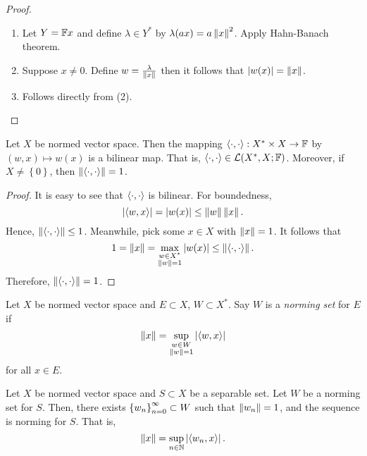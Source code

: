 \documentclass[a4paper]{article}
\begin{document}
\begin{proof}

\begin{enumerate}
\item Let $Y = \mathbb{F} x$ and define $\lambda \in Y^*$ by 
$\lambda(a x) = a \left\lVert x\right\rVert^2$. Apply Hahn-Banach theorem.

\item Suppose $x \neq 0$. Define $w = \frac{\lambda}{\left\lVert x\right\rVert}$
then it follows that $\left\lvert w(x)\right\rvert = \left\lVert x\right\rVert$.

\item Follows directly from (2).
\end{enumerate}

\end{proof}

\begin{prop}
Let $X$ be normed vector space. Then the mapping 
$\langle \cdot, \cdot \rangle : X^* \times X \to \mathbb{F}$ by 
$(w, x) \mapsto w(x)$ is a bilinear map. That is, 
$\langle \cdot , \cdot \rangle \in \mathcal{L}(X^*, X ; \mathbb{F})$. 
Moreover, 
if $X \neq \left\{ 0 \right\}$, 
then $\left\lVert \langle \cdot, \cdot \rangle\right\rVert
= 1$.
\end{prop}

\begin{proof}
It is easy to see that $\langle \cdot, \cdot \rangle$ is 
bilinear.  For boundedness, 
\[
\left\lvert \langle w, x \rangle\right\rvert = \left\lvert w(x)\right\rvert \leq \left\lVert w\right\rVert \left\lVert x\right\rVert.
\]
Hence, $\left\lVert \langle \cdot, \cdot \rangle\right\rVert \leq 1$. Meanwhile, 
pick some $x \in X$ with $\left\lVert x\right\rVert = 1$. It follows that 
\[
1 = \left\lVert x\right\rVert = \max_{\substack{w \in X^* \\ \left\lVert w\right\rVert = 1}}
\left\lvert w(x)\right\rvert \leq \left\lVert \langle \cdot, \cdot \rangle\right\rVert.
\]
Therefore, $\left\lVert \langle \cdot, \cdot \rangle\right\rVert = 1$.
\end{proof}

\begin{defi}
  Let $X$ be normed vector space and $E \subset X$, 
  $W \subset X^*$. Say $W$ is a \emph{norming set}
  for $E$ if 
  \[
  \left\lVert x\right\rVert = \sup_{\substack{w \in W \\ \left\lVert w\right\rVert = 1}} 
  \left\lvert \langle w, x \rangle\right\rvert
  \]
  for all $x \in E$.
\end{defi}

\begin{prop}

Let $X$ be normed vector space and $S \subset X$ be a 
separable set. Let $W$ be a norming set for $S$. Then, 
there exists $\left\{ w_n \right\}_{n=0}^\infty \subset W$ such that $\left\lVert w_n\right\rVert 
= 1$, and the sequence is norming for $S$. That is, 
\[
\left\lVert x\right\rVert = \sup_{n \in \mathbb{N}} \left\lvert \langle w_n, x \rangle\right\rvert.
\]
\end{prop}
\end{document}
